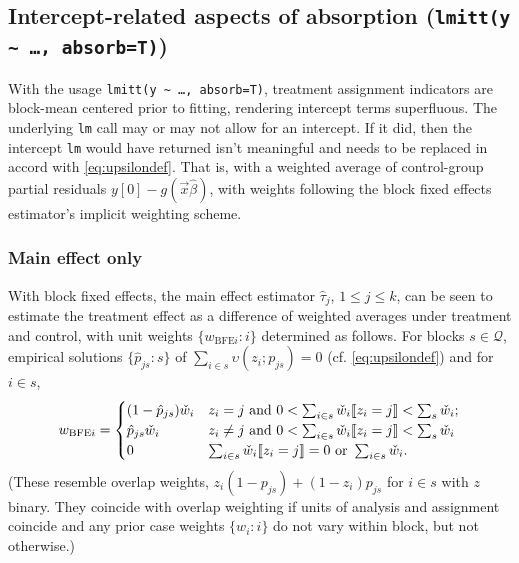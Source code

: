 \documentclass{article}
\DeclarePairedDelimiter{\indicator}{\llbracket}{\rrbracket}
\newcommand{\owt}[1][{[z_{i}]}]{\ensuremath{\check{w}_{i#1}}}
\newcommand{\absorbInterceptsEF}{\upsilon}
\begin{document}
\subsection{Intercept-related aspects of absorption  (\texttt{lmitt(y
    \textasciitilde\ \ldots, absorb=T)})}\label{sec:interc-relat-aspects}
With the usage \texttt{lmitt(y \textasciitilde\ \ldots, absorb=T)},
treatment assignment indicators are block-mean centered prior to
fitting, rendering intercept terms superfluous.  The underlying
\texttt{lm} call may or may not allow for an intercept. If it did,
then the intercept \texttt{lm} would have returned isn't meaningful
and needs to be replaced in accord with \eqref{eq:upsilondef}.  That
is, with a weighted average of control-group partial residuals $y[0] -
g(\vec{x}\hat\beta)$, with weights following the
block fixed effects estimator's implicit weighting scheme.

\subsubsection{Main effect only}
With block fixed effects, the main effect estimator $\hat{\tau}_{j}$,
$1\leq j \leq k$,  can be seen to
estimate the treatment effect as a difference of weighted averages
under treatment and control, with unit weights $\{w_{\text{BFE}i}:
i\}$ determined as follows. For blocks $s \in \mathcal{Q}$, 
empirical solutions $\{\hat{p}_{js}:s\}$  of $\sum_{i \in s}
\absorbInterceptsEF (z_{i}; p_{js})=0$ (cf. \eqref{eq:upsilondef}) and
for $i \in s$,
\begin{equation} \label{eq:28}
w_{\text{BFE}i} = 
  \begin{cases}
(1-\hat{p}_{js})\owt[]& z_i=j \text{ and } 0 < \sum_{i
    \in s} \owt[] \indicator{z_i=j} < \sum_s \owt[];\\ 
\hat{p}_{js} \owt[] & z_i\neq j \text{ and }0 < \sum_{i
  \in s} \owt[] \indicator{z_i=j} < \sum_s \owt[]\\
0 &  \sum_{i \in s} \owt[] \indicator{z_i=j} = 0 \text{ or }
  \sum_{i \in s} \owt[].
\end{cases}
\end{equation}
(These resemble overlap weights, $z_{i}(1-p_{js}) +
(1-z_{i})p_{js}$ for $i\in s$ with $z$ binary. They coincide with
overlap weighting if units of analysis and assignment coincide and
any prior case weights $\{w_{i}:i\}$ do not vary within block, but not
otherwise.)
\end{document}
